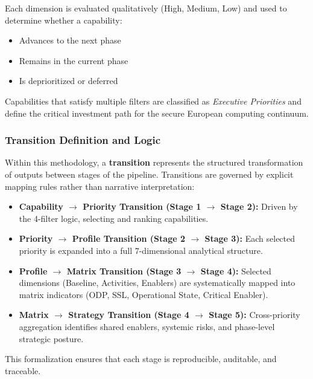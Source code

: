\documentclass{ieeeaccess}
\begin{document}
Each dimension is evaluated qualitatively (High, Medium, Low) and used to determine whether a capability:

\begin{itemize}
    \item Advances to the next phase
    \item Remains in the current phase
    \item Is deprioritized or deferred
\end{itemize}



Capabilities that satisfy multiple filters are classified as \textit{Executive Priorities} and define the critical investment path for the secure European computing continuum.

\subsubsection*{Transition Definition and Logic}

Within this methodology, a \textbf{transition} represents the structured transformation of outputs between stages of the pipeline. Transitions are governed by explicit mapping rules rather than narrative interpretation:

\begin{itemize}
    \item \textbf{Capability $\rightarrow$ Priority Transition (Stage 1 $\rightarrow$ Stage 2):} Driven by the 4-filter logic, selecting and ranking capabilities.

    \item \textbf{Priority $\rightarrow$ Profile Transition (Stage 2 $\rightarrow$ Stage 3):} Each selected priority is expanded into a full 7-dimensional analytical structure.

    \item \textbf{Profile $\rightarrow$ Matrix Transition (Stage 3 $\rightarrow$ Stage 4):} Selected dimensions (Baseline, Activities, Enablers) are systematically mapped into matrix indicators (ODP, SSL, Operational State, Critical Enabler).

    \item \textbf{Matrix $\rightarrow$ Strategy Transition (Stage 4 $\rightarrow$ Stage 5):} Cross-priority aggregation identifies shared enablers, systemic risks, and phase-level strategic posture.
\end{itemize}

This formalization ensures that each stage is reproducible, auditable, and traceable.
\end{document}

